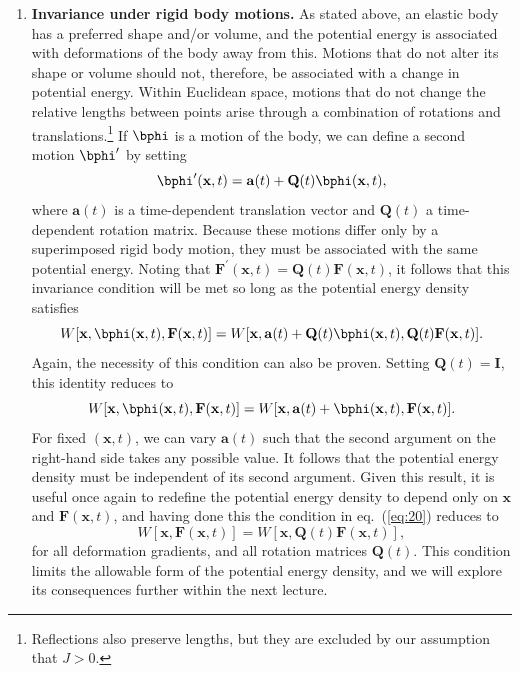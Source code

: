 \begin{enumerate}
    \item[(ii)] \textbf{Invariance under rigid body motions.} As stated above, an elastic body has a preferred shape and/or volume, 
    and the potential energy is associated with deformations of the body away from this. Motions that do not alter its shape or 
    volume should not, therefore, be associated with a change in potential energy. Within Euclidean space, motions that do 
    not change the relative lengths between points arise through a combination of rotations and translations.\footnote{Reflections also preserve lengths, but they are excluded by our assumption that $J>0$.} If $\bphi$ 
    is a motion of the body, we can define a second motion $\bphi^{\prime}$ by setting
    \begin{equation}
    \bphi^{\prime}(\mathbf{x},t)=\mathbf{a}(t)+\mathbf{Q}(t)\bphi(\mathbf{x},t),
    \label{eq:19}
    \end{equation}
    where $\mathbf{a}(t)$ is a time-dependent translation vector and $\mathbf{Q}(t)$ a time-dependent rotation matrix. Because these motions differ only by a superimposed rigid body motion, they 
    must be associated with the same potential energy. Noting that $\mathbf{F}^{\prime}(\mathbf{x},t)=\mathbf{Q}(t)\mathbf{F}(\mathbf{x},t)$, 
    it follows that this invariance condition will be met so long as the potential energy density satisfies
    \begin{equation}
    W[\mathbf{x},\bphi(\mathbf{x},t),\mathbf{F}(\mathbf{x},t)]=W[\mathbf{x},\mathbf{a}(t)
    +\mathbf{Q}(t)\bphi(\mathbf{x},t),\mathbf{Q}(t)\mathbf{F}(\mathbf{x},t)].
    \label{eq:20}
    \end{equation}
    Again, the necessity of this condition can also be proven. Setting $\mathbf{Q}(t)=\mathbf{I}$, this identity reduces to
    \begin{equation}
    W[\mathbf{x},\bphi(\mathbf{x},t),\mathbf{F}(\mathbf{x},t)]=W[\mathbf{x},\mathbf{a}(t)+\bphi(\mathbf{x},t),\mathbf{F}(\mathbf{x},t)].
    \label{eq:21}
    \end{equation}
    For fixed $(\mathbf{x}, t)$, we can vary $\mathbf{a}(t)$ such that the second argument on the right-hand side takes any possible value.
     It follows that the potential energy density must be independent of its second argument. Given this result, it is useful once again 
     to redefine the potential energy density to depend only on $\mathbf{x}$ and $\mathbf{F}(\mathbf{x},t)$, and having done this 
     the condition in eq.~(\ref{eq:20}) reduces to
    \begin{equation}
    W[\mathbf{x},\mathbf{F}(\mathbf{x},t)]=W[\mathbf{x},\mathbf{Q}(t)\mathbf{F}(\mathbf{x},t)],
    \label{eq:22}
    \end{equation}
    for all deformation gradients, and all rotation matrices $\mathbf{Q}(t)$. This condition limits the allowable form of the potential
    energy density, and we will explore its consequences further within the next lecture.
\end{enumerate}
